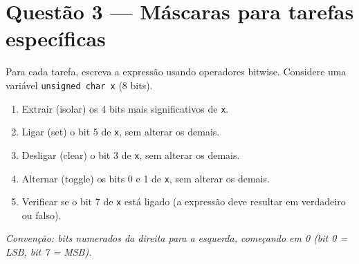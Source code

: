 \documentclass[12pt,a4paper]{article}
\newif\ifmostrarrespostas
\begin{document}
\ifmostrarrespostas
\begin{tcolorbox}[colback=red!5, colframe=red!40, title=\textbf{Resposta --- Questão 2}, fonttitle=\small]
\small
\begin{enumerate}[label=\alph*)]
  \item AND com \texttt{0b00110000} (\texttt{0x30}): \texttt{0b10110110 \& 0x30 = 0b00110000}
  \item OR com \texttt{0b00000111} (\texttt{0x07}): \texttt{0b10100000 | 0x07 = 0b10100111}
  \item AND com \texttt{0b11110111} (\texttt{0xF7}), ou equivalentemente \texttt{\& \~{}(1 << 3)}: limpa o bit 3.
  \item XOR com \texttt{0b11111111} (\texttt{0xFF}), ou equivalentemente NOT (\texttt{\~{}}): inverte todos os bits.
\end{enumerate}
\end{tcolorbox}
\fi

\section{Questão 3 --- Máscaras para tarefas específicas}

Para cada tarefa, escreva a expressão usando operadores bitwise. Considere uma variável \texttt{unsigned char x} (8 bits).

\begin{enumerate}[label=\alph*)]
  \item Extrair (isolar) os 4 bits mais significativos de \texttt{x}.
  \item Ligar (set) o bit 5 de \texttt{x}, sem alterar os demais.
  \item Desligar (clear) o bit 3 de \texttt{x}, sem alterar os demais.
  \item Alternar (toggle) os bits 0 e 1 de \texttt{x}, sem alterar os demais.
  \item Verificar se o bit 7 de \texttt{x} está ligado (a expressão deve resultar em verdadeiro ou falso).
\end{enumerate}

{\small\textit{Convenção: bits numerados da direita para a esquerda, começando em 0 (bit 0 = LSB, bit 7 = MSB).}}

\ifmostrarrespostas
\begin{tcolorbox}[colback=red!5, colframe=red!40, title=\textbf{Resposta --- Questão 3}, fonttitle=\small]
\small
\begin{enumerate}[label=\alph*)]
  \item \texttt{x \& 0xF0}
  \item \texttt{x | (1 << 5)} \quad ou \quad \texttt{x | 0x20}
  \item \texttt{x \& \~{}(1 << 3)} \quad ou \quad \texttt{x \& 0xF7}
  \item \texttt{x \^{} 0x03}
  \item \texttt{(x \& 0x80) != 0} \quad ou \quad \texttt{x \& (1 << 7)}
\end{enumerate}
\end{tcolorbox}
\fi
\end{document}
